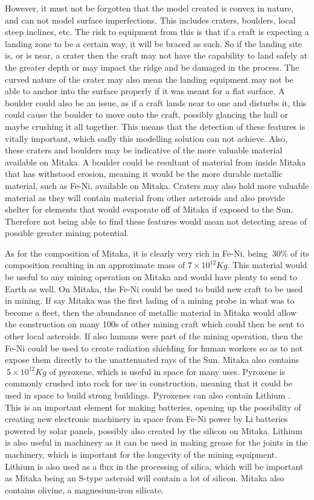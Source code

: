 \documentclass[10pt,twocolumn]{revtex4}    %
\newcommand{\E}[1]{\times10^{#1}}
\begin{document}
However, it must not be forgotten that the model created is convex in nature, and can not model surface imperfections. This includes craters, boulders, local steep inclines, etc. The risk to equipment from this is that if a craft is expecting a landing zone to be a certain way, it will be braced as such. So if the landing site is, or is near, a crater then the craft may not have the capability to land safely at the greater depth or may impact the ridge and be damaged in the process. The curved nature of the crater may also mean the landing equipment may not be able to anchor into the surface properly if it was meant for a flat surface. A boulder could also be an issue, as if a craft lands near to one and disturbs it, this could cause the boulder to move onto the craft, possibly glancing the hull or maybe crushing it all together. This means that the detection of these features is vitally important, which sadly this modelling solution can not achieve.
Also, these craters and boulders may be indicative of the more valuable material available on Mitaka. A boulder could be resultant of material from inside Mitaka that has withstood erosion, meaning it would be the more durable metallic material, such as Fe-Ni, available on Mitaka. Craters may also hold more valuable material as they will contain material from other asteroids and also provide shelter for elements that would evaporate off of Mitaka if exposed to the Sun. Therefore not being able to find these features would mean not detecting areas of possible greater mining potential.

As for the composition of Mitaka, it is clearly very rich in Fe-Ni, being $~30\%$ of its composition resulting in an approximate mass of $7\times10^{12} Kg$. This material would be useful to any mining operation on Mitaka and would have plenty to send to Earth as well. On Mitaka, the Fe-Ni could be used to build new craft to be used in mining. If say Mitaka was the first lading of a mining probe in what was to become a fleet, then the abundance of metallic material in Mitaka would allow the construction on many 100s of other mining craft which could then be sent to other local asteroids. If also humans were part of the mining operation, then the Fe-Ni could be used to create radiation shielding for human workers so as to not expose them directly to the unattenuated rays of the Sun.
Mitaka also contains $~5\E{12} Kg$ of pyroxene, which is useful in space for many uses. Pyroxene is commonly crushed into rock for use in construction, meaning that it could be used in space to build strong buildings. 
Pyroxenes can also contain Lithium \cite{LiInProx}. This is an important element for making batteries, opening up the possibility of creating new electronic machinery in space from Fe-Ni power by Li batteries powered by solar panels, possibly also created by the silicon on Mitaka. Lithium is also useful in machinery as it can be used in making grease for the joints in the machinery, which is important for the longevity of the mining equipment.
Lithium is also used as a flux in the processing of silica, which will be important as Mitaka being an S-type asteroid will contain a lot of silicon. 
Mitaka also contains olivine, a magnesium-iron silicate.
\end{document}

